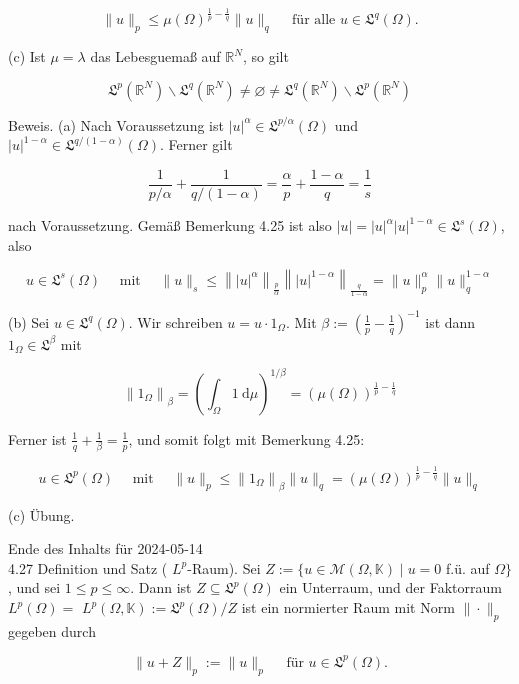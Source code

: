 \documentclass[10pt, letterpaper]{article}
\begin{document}
$$
\|u\|_{p} \leq \mu(\Omega)^{\frac{1}{p}-\frac{1}{q}}\|u\|_{q} \quad \text { für alle } u \in \mathfrak{L}^{q}(\Omega) .
$$

(c) Ist $\mu=\lambda$ das Lebesguemaß auf $\mathbb{R}^{N}$, so gilt

$$
\mathfrak{L}^{p}\left(\mathbb{R}^{N}\right) \backslash \mathfrak{L}^{q}\left(\mathbb{R}^{N}\right) \neq \varnothing \neq \mathfrak{L}^{q}\left(\mathbb{R}^{N}\right) \backslash \mathfrak{L}^{p}\left(\mathbb{R}^{N}\right)
$$

Beweis. (a) Nach Voraussetzung ist $|u|^{\alpha} \in \mathfrak{L}^{p / \alpha}(\Omega)$ und $|u|^{1-\alpha} \in \mathfrak{L}^{q /(1-\alpha)}(\Omega)$. Ferner gilt

$$
\frac{1}{p / \alpha}+\frac{1}{q /(1-\alpha)}=\frac{\alpha}{p}+\frac{1-\alpha}{q}=\frac{1}{s}
$$

nach Voraussetzung. Gemäß Bemerkung 4.25 ist also $|u|=|u|^{\alpha}|u|^{1-\alpha} \in \mathfrak{L}^{s}(\Omega)$, also

$$
u \in \mathfrak{L}^{s}(\Omega) \quad \text { mit } \quad\|u\|_{s} \leq\left\||u|^{\alpha}\right\|_{\frac{p}{\alpha}}\left\||u|^{1-\alpha}\right\|_{\frac{q}{1-\alpha}}=\|u\|_{p}^{\alpha}\|u\|_{q}^{1-\alpha}
$$

(b) Sei $u \in \mathfrak{L}^{q}(\Omega)$. Wir schreiben $u=u \cdot 1_{\Omega}$. Mit $\beta:=\left(\frac{1}{p}-\frac{1}{q}\right)^{-1}$ ist dann $1_{\Omega} \in \mathfrak{L}^{\beta}$ mit

$$
\left\|1_{\Omega}\right\|_{\beta}=\left(\int_{\Omega} 1 \mathrm{~d} \mu\right)^{1 / \beta}=(\mu(\Omega))^{\frac{1}{p}-\frac{1}{q}}
$$

Ferner ist $\frac{1}{q}+\frac{1}{\beta}=\frac{1}{p}$, und somit folgt mit Bemerkung 4.25:

$$
u \in \mathfrak{L}^{p}(\Omega) \quad \text { mit } \quad\|u\|_{p} \leq\left\|1_{\Omega}\right\|_{\beta}\|u\|_{q}=(\mu(\Omega))^{\frac{1}{p}-\frac{1}{q}}\|u\|_{q}
$$

(c) Übung.

Ende des Inhalts für 2024-05-14\\
4.27 Definition und Satz ( $L^{p}$-Raum). Sei $Z:=\{u \in \mathcal{M}(\Omega, \mathbb{K}) \mid u=0$ f.ü. auf $\Omega\}$, und sei $1 \leq p \leq \infty$. Dann ist $Z \subseteq \mathfrak{L}^{p}(\Omega)$ ein Unterraum, und der Faktorraum $L^{p}(\Omega)=$ $L^{p}(\Omega, \mathbb{K}):=\mathfrak{L}^{p}(\Omega) / Z$ ist ein normierter Raum mit Norm $\|\cdot\|_{p}$ gegeben durch

$$
\|u+Z\|_{p}:=\|u\|_{p} \quad \text { für } u \in \mathfrak{L}^{p}(\Omega) .
$$
\end{document}
